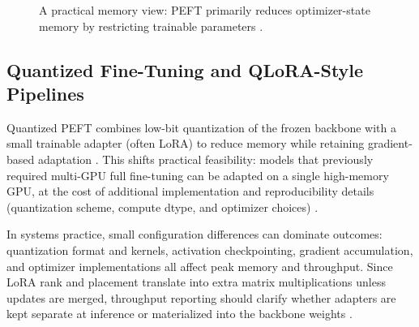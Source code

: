 \documentclass[conference]{IEEEtran}
\begin{document}
\begin{figure}[t]
    \centering
    \caption{A practical memory view: PEFT primarily reduces optimizer-state memory by restricting trainable parameters \cite{dettmers2023qlora,han2024parameter}.}
    \label{fig:peft-memory}
\end{figure}

\subsection{Quantized Fine-Tuning and QLoRA-Style Pipelines}
Quantized PEFT combines low-bit quantization of the frozen backbone with a small trainable adapter (often LoRA) to reduce memory while retaining gradient-based adaptation \cite{dettmers2023qlora}. This shifts practical feasibility: models that previously required multi-GPU full fine-tuning can be adapted on a single high-memory GPU, at the cost of additional implementation and reproducibility details (quantization scheme, compute dtype, and optimizer choices) \cite{han2024parameter,prottasha2025peft}.

In systems practice, small configuration differences can dominate outcomes: quantization format and kernels, activation checkpointing, gradient accumulation, and optimizer implementations all affect peak memory and throughput. Since LoRA rank and placement translate into extra matrix multiplications unless updates are merged, throughput reporting should clarify whether adapters are kept separate at inference or materialized into the backbone weights \cite{hu2021lora,dettmers2023qlora,prottasha2025peft}.
\end{document}
